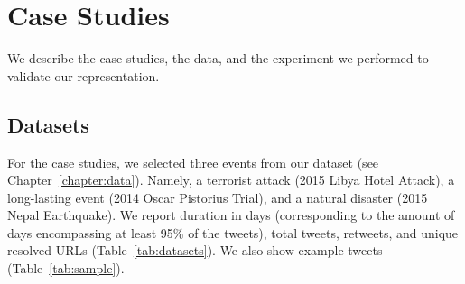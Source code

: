 \section{Case Studies}
\label{sec:experimental}

We describe the case studies, the data, and the experiment we performed to
validate our representation.

\subsection{Datasets}

%
%
%
For the case studies, we selected three events from our dataset (see
Chapter~\ref{chapter:data}). Namely, a terrorist attack (2015 Libya Hotel
Attack), a long-lasting event (2014 Oscar Pistorius Trial), and a natural
disaster (2015 Nepal Earthquake).
%
%
We report duration in days (corresponding to the amount of days encompassing at
least 95\% of the tweets), total tweets, retweets, and unique resolved URLs
(Table~\ref{tab:datasets}).
%
We also show example tweets (Table~\ref{tab:sample}).



